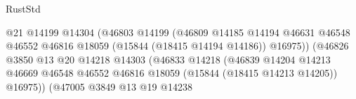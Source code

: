 \begin{lexlean}{RustStd}
\begin{coremodule}
                                                          @21
                                                          @14199
                                                          @14304
                                                          (@46803
                                                            @14199
                                                            (@46809
                                                              @14185
                                                              @14194
                                                              @46631
                                                              @46548
                                                              @46552
                                                              @46816
                                                              @18059
                                                              (@15844 (@18415 @14194 @14186))
                                                              @16975))
                                                          (@46826
                                                            @3850
                                                            @13
                                                            @20
                                                            @14218
                                                            @14303
                                                            (@46833
                                                              @14218
                                                              (@46839
                                                                @14204
                                                                @14213
                                                                @46669
                                                                @46548
                                                                @46552
                                                                @46816
                                                                @18059
                                                                (@15844 (@18415 @14213 @14205))
                                                                @16975))
                                                            (@47005
                                                              @3849
                                                              @13
                                                              @19
                                                              @14238

\end{coremodule}
\end{lexlean}
